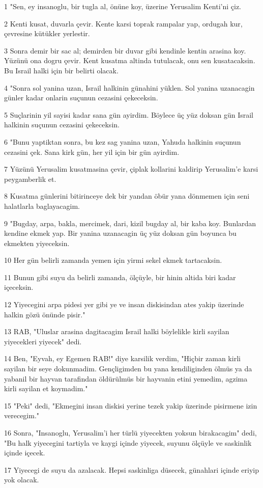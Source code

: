 \par 1 "Sen, ey insanoglu, bir tugla al, önüne koy, üzerine Yerusalim Kenti'ni çiz.
\par 2 Kenti kusat, duvarla çevir. Kente karsi toprak rampalar yap, ordugah kur, çevresine kütükler yerlestir.
\par 3 Sonra demir bir sac al; demirden bir duvar gibi kendinle kentin arasina koy. Yüzünü ona dogru çevir. Kent kusatma altinda tutulacak, onu sen kusatacaksin. Bu Israil halki için bir belirti olacak.
\par 4 "Sonra sol yanina uzan, Israil halkinin günahini yüklen. Sol yanina uzanacagin günler kadar onlarin suçunun cezasini çekeceksin.
\par 5 Suçlarinin yil sayisi kadar sana gün ayirdim. Böylece üç yüz doksan gün Israil halkinin suçunun cezasini çekeceksin.
\par 6 "Bunu yaptiktan sonra, bu kez sag yanina uzan, Yahuda halkinin suçunun cezasini çek. Sana kirk gün, her yil için bir gün ayirdim.
\par 7 Yüzünü Yerusalim kusatmasina çevir, çiplak kollarini kaldirip Yerusalim'e karsi peygamberlik et.
\par 8 Kusatma günlerini bitirinceye dek bir yandan öbür yana dönmemen için seni halatlarla baglayacagim.
\par 9 "Bugday, arpa, bakla, mercimek, dari, kizil bugday al, bir kaba koy. Bunlardan kendine ekmek yap. Bir yanina uzanacagin üç yüz doksan gün boyunca bu ekmekten yiyeceksin.
\par 10 Her gün belirli zamanda yemen için yirmi sekel ekmek tartacaksin.
\par 11 Bunun gibi suyu da belirli zamanda, ölçüyle, bir hinin altida biri kadar içeceksin.
\par 12 Yiyecegini arpa pidesi yer gibi ye ve insan diskisindan ates yakip üzerinde halkin gözü önünde pisir."
\par 13 RAB, "Uluslar arasina dagitacagim Israil halki böylelikle kirli sayilan yiyecekleri yiyecek" dedi.
\par 14 Ben, "Eyvah, ey Egemen RAB!" diye karsilik verdim, "Hiçbir zaman kirli sayilan bir seye dokunmadim. Gençligimden bu yana kendiliginden ölmüs ya da yabanil bir hayvan tarafindan öldürülmüs bir hayvanin etini yemedim, agzima kirli sayilan et koymadim."
\par 15 "Peki" dedi, "Ekmegini insan diskisi yerine tezek yakip üzerinde pisirmene izin verecegim."
\par 16 Sonra, "Insanoglu, Yerusalim'i her türlü yiyecekten yoksun birakacagim" dedi, "Bu halk yiyecegini tartiyla ve kaygi içinde yiyecek, suyunu ölçüyle ve saskinlik içinde içecek.
\par 17 Yiyecegi de suyu da azalacak. Hepsi saskinliga düsecek, günahlari içinde eriyip yok olacak.

